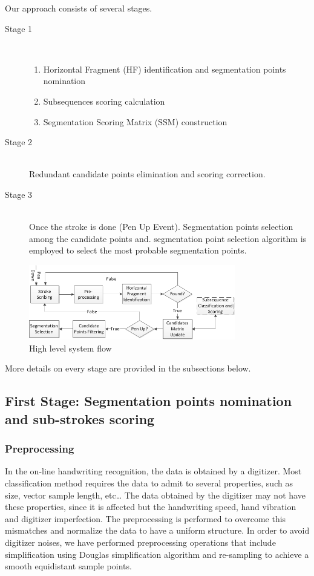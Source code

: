 \documentclass[12pt,journal,compsoc]{IEEEtran}
\begin{document}
Our approach consists of several stages. 
\begin{description}
  \item[Stage 1] \hfill \\
  \begin{enumerate}
  \item Horizontal Fragment (HF) identification and segmentation points nomination
  \item Subsequences scoring calculation
  \item Segmentation Scoring Matrix (SSM) construction
  \end{enumerate}
  \item[Stage 2] \hfill \\
  Redundant candidate points elimination and scoring correction.
  \item[Stage 3] \hfill \\
  Once the stroke is done (Pen Up Event). Segmentation points selection among the candidate points and. segmentation point selection algorithm is employed to select the most probable segmentation points.
\end{description}

\begin{figure}
\centering
\includegraphics[width=9cm]{./figures/system_flow}
\caption{High level system flow}
\label{fig:system_flow}
\end{figure}

More details on every stage are provided in the subsections below.

\subsection{First Stage: Segmentation points nomination and sub-strokes scoring}

\subsubsection{Preprocessing}
In the on-line handwriting recognition, the data is obtained by a digitizer. Most classification method requires the data to admit to several properties, such as size, vector sample length, etc… The data obtained by the digitizer may not have these properties, since it is affected but the handwriting speed, hand vibration and digitizer imperfection. The preprocessing is performed to overcome this mismatches and normalize the data to have a uniform structure. In order to avoid digitizer noises, we have performed preprocessing operations that include simplification using Douglas simplification algorithm and re-sampling to achieve a smooth equidistant sample points. 
 
\end{document}
